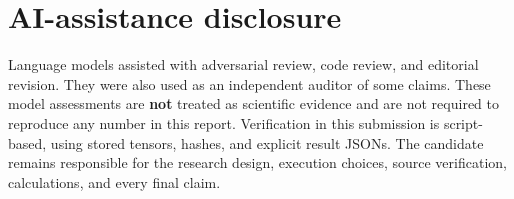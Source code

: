 \section{AI-assistance disclosure}

Language models assisted with adversarial review, code review, and editorial
revision. They were also used as an independent auditor of some claims. These
model assessments are \textbf{not} treated as scientific evidence and are not
required to reproduce any number in this report. Verification in this submission
is script-based, using stored tensors, hashes, and explicit result JSONs. The
candidate remains responsible for the research design, execution choices, source
verification, calculations, and every final claim.
